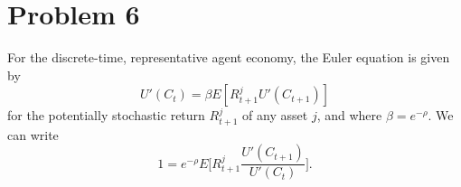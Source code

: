 \documentclass[11pt]{extarticle}
\theoremstyle{plain}
\theoremstyle{definition}
\begin{document}
\vspace{10mm}
\section*{Problem 6}



For the discrete-time, representative agent economy, the Euler equation is given by
\begin{equation*}
	U'(C_t) = \beta E[R_{t+1}^j U'(C_{t+1})]
\end{equation*}
for the potentially stochastic return $R_{t+1}^j$ of any asset $j$, and where $\beta = e^{-\rho}$. We can write 
\begin{equation*}
	1 = e^{-\rho} E\bigg[R_{t+1}^j \frac{U'(C_{t+1})}{U'(C_t)} \bigg].
\end{equation*}
\end{document}

